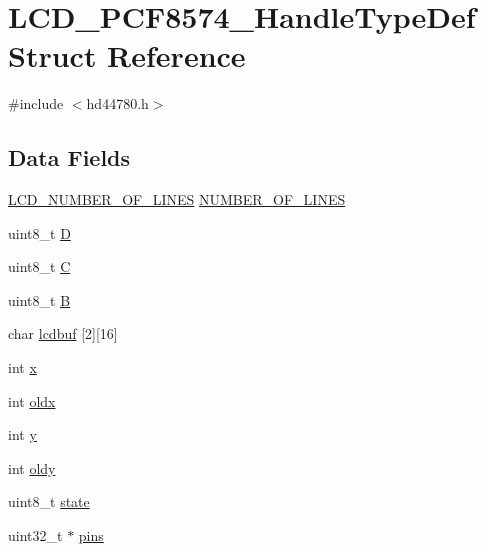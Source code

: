 \hypertarget{struct_l_c_d___p_c_f8574___handle_type_def}{}\section{L\+C\+D\+\_\+\+P\+C\+F8574\+\_\+\+Handle\+Type\+Def Struct Reference}
\label{struct_l_c_d___p_c_f8574___handle_type_def}


{\ttfamily \#include $<$hd44780.\+h$>$}

\subsection*{Data Fields}
\begin{DoxyCompactItemize}
\item 
\mbox{\hyperlink{hd44780_8h_a2ca03c41c55258ff007de37b98ae5d74}{L\+C\+D\+\_\+\+N\+U\+M\+B\+E\+R\+\_\+\+O\+F\+\_\+\+L\+I\+N\+ES}} \mbox{\hyperlink{struct_l_c_d___p_c_f8574___handle_type_def_a8c2910923896bb5164d2e2a3367cfe28}{N\+U\+M\+B\+E\+R\+\_\+\+O\+F\+\_\+\+L\+I\+N\+ES}}
\item 
uint8\+\_\+t \mbox{\hyperlink{struct_l_c_d___p_c_f8574___handle_type_def_a42ede28e876dcdb2ce2ddd730de0401e}{D}}
\item 
uint8\+\_\+t \mbox{\hyperlink{struct_l_c_d___p_c_f8574___handle_type_def_a6f32a714c227b07e27db3e599edb419a}{C}}
\item 
uint8\+\_\+t \mbox{\hyperlink{struct_l_c_d___p_c_f8574___handle_type_def_a7c7fb36d372d349a62c14f1e6c7337ea}{B}}
\item 
char \mbox{\hyperlink{struct_l_c_d___p_c_f8574___handle_type_def_ae8b09ea4097089c2e7d706fb370c27b3}{lcdbuf}} \mbox{[}2\mbox{]}\mbox{[}16\mbox{]}
\item 
int \mbox{\hyperlink{struct_l_c_d___p_c_f8574___handle_type_def_a6150e0515f7202e2fb518f7206ed97dc}{x}}
\item 
int \mbox{\hyperlink{struct_l_c_d___p_c_f8574___handle_type_def_a422bc92f102f94a46f3dd05b018f9bff}{oldx}}
\item 
int \mbox{\hyperlink{struct_l_c_d___p_c_f8574___handle_type_def_a0a2f84ed7838f07779ae24c5a9086d33}{y}}
\item 
int \mbox{\hyperlink{struct_l_c_d___p_c_f8574___handle_type_def_ae474adb7b3241444a48b7b072bd864a6}{oldy}}
\item 
uint8\+\_\+t \mbox{\hyperlink{struct_l_c_d___p_c_f8574___handle_type_def_a0b57aa10271a66f3dc936bba1d2f3830}{state}}
\item 
uint32\+\_\+t $\ast$ \mbox{\hyperlink{struct_l_c_d___p_c_f8574___handle_type_def_a26fa4220cc8b522135924c010d9214a9}{pins}}

\end{DoxyCompactItemize}

